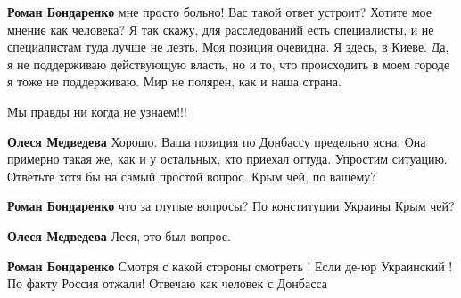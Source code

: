 \begin{itemize}
\begin{itemize}
\textbf{Роман Бондаренко} мне просто больно! Вас такой ответ устроит? Хотите мое мнение как человека? Я так скажу, для расследований есть специалисты, и не специалистам туда лучше не лезть. Моя позиция очевидна. Я здесь, в Киеве. Да, я не поддерживаю действующую власть, но и то, что происходить в моем городе я тоже не поддерживаю. Мир не полярен, как и наша страна.

 
Мы правды ни когда не узнаем!!! 🙈🙉🙊

 
\textbf{Олеся Медведева} Хорошо. Ваша позиция по Донбассу предельно ясна. Она
примерно такая же, как и у остальных, кто приехал оттуда. Упростим ситуацию.
Ответьте хотя бы на самый простой вопрос. Крым чей, по вашему?

 
\textbf{Роман Бондаренко} что за глупые вопросы? По конституции Украины Крым чей?

 
\textbf{Олеся Медведева} Леся, это был вопрос.

 
\textbf{Роман Бондаренко} Смотря с какой стороны смотреть ! Если де-юр Украинский ! По факту Россия отжали! Отвечаю как человек с Донбасса


\end{itemize}
\end{itemize}
